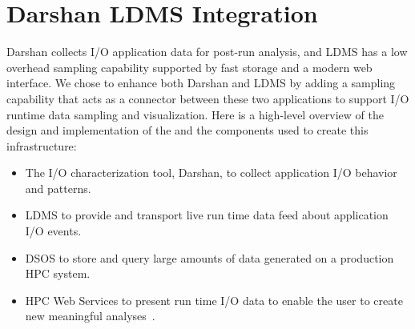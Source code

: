 \section{Darshan LDMS Integration}
\label{sec:DarshanLDMSIntegration}

Darshan collects I/O application data for post-run analysis, and LDMS has a low overhead sampling capability supported by fast storage and a modern web interface. We chose to enhance both Darshan and LDMS by adding a sampling capability that acts as a connector between these two applications to support I/O runtime data sampling and visualization. Here is a high-level overview of the design and implementation of the \Darshan{} and the components used to create this infrastructure:
\begin{itemize}
	\item The I/O characterization tool, Darshan, to collect application I/O behavior and patterns. 
	\item LDMS to provide and transport live run time data feed about application I/O events.~\cite{ldmsgithubwiki}
	\item DSOS to store and query large amounts of data generated on a production HPC system.~\cite{sosgithub}
	\item HPC Web Services to present run time I/O data to enable the user to create new meaningful analyses~\cite{ClusterAV}.
\end{itemize}


